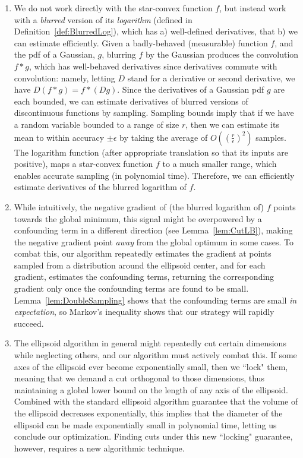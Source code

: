 \documentclass[11pt,letter]{article}
\newcommand{\ferr}{\epsilon}
\numberwithin{nTheorems}{section}
\begin{document}
\begin{enumerate}
  \item We do not work directly with the star-convex function $f$, but instead work with a \emph{blurred} version of its \emph{logarithm} (defined in Definition~\ref{def:BlurredLog}), which has a) well-defined derivatives, that b) we can estimate efficiently.
Given a badly-behaved (measurable) function $f$, and the pdf of a Gaussian, $g$, blurring $f$ by the Gaussian produces the convolution $f\ast g$, which has well-behaved derivatives since derivatives commute with convolution: namely, letting $D$ stand for a derivative or second derivative, we have $D(f\ast g)=f\ast (D g)$.
Since the derivatives of a Gaussian pdf $g$ are each bounded, we can estimate derivatives of blurred versions of discontinuous functions by sampling.
Sampling bounds imply that if we have a random variable bounded to a range of size $r$, then we can estimate its mean to within accuracy $\pm\ferr$ by taking the average of $O((\frac{r}{\ferr})^2)$ samples.
The logarithm function (after appropriate translation so that its inputs are positive), maps a star-convex function $f$ to a much smaller range, which enables accurate sampling (in polynomial time).
Therefore, we can efficiently estimate derivatives of the blurred logarithm of $f$.
  \item While intuitively, the negative gradient of (the blurred logarithm of) $f$ points towards the global minimum, this signal might be overpowered by a confounding term in a different direction (see Lemma~\ref{lem:CutLB}), making the negative gradient point \emph{away} from the global optimum in some cases.
To combat this, our algorithm repeatedly estimates the gradient at points sampled from a distribution around the ellipsoid center, and for each gradient, estimates the confounding terms, returning the corresponding gradient only once the confounding terms are found to be small.
Lemma~\ref{lem:DoubleSampling} shows that the confounding terms are small \emph{in expectation}, so Markov's inequality shows that our strategy will rapidly succeed.
  \item The ellipsoid algorithm in general might repeatedly cut certain dimensions while neglecting others, and our algorithm must actively combat this.
If some axes of the ellipsoid ever become exponentially small, then we ``lock" them, meaning that we demand a cut orthogonal to those dimensions, thus maintaining a global lower bound on the length of any axis of the ellipsoid.
Combined with the standard ellipsoid algorithm guarantee that the volume of the ellipsoid decreases exponentially, this implies that the diameter of the ellipsoid can be made exponentially small in polynomial time, letting us conclude our optimization. Finding cuts under this new ``locking" guarantee, however, requires a new algorithmic technique.


\end{enumerate}
\end{document}
